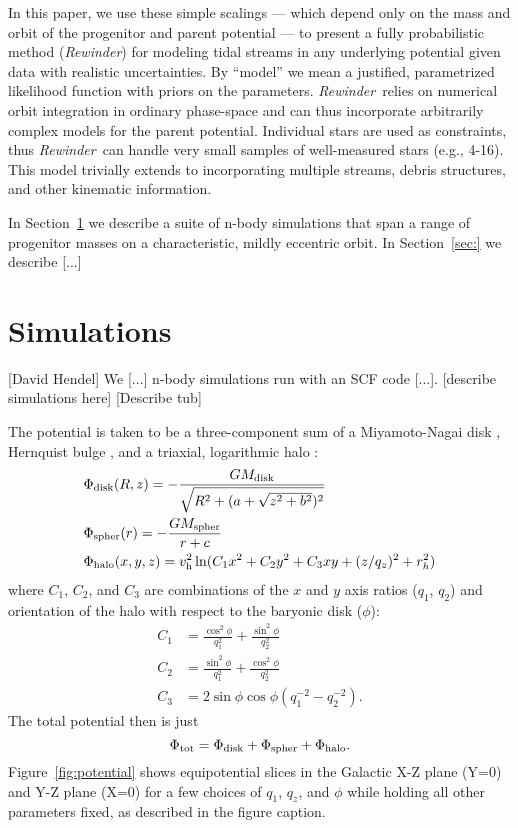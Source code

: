 \documentclass[letterpaper,12pt,preprint]{aastex}
\newcommand{\vhalo}{v_{\rm h}}
\newcommand{\rewinder}{\emph{Rewinder}}
\begin{document}
In this paper, we use these simple scalings --- which depend only on the mass and orbit of the progenitor and parent potential --- to present a fully probabilistic method (\rewinder) for modeling tidal streams in any underlying potential given data with realistic uncertainties. By ``model'' we mean a justified, parametrized likelihood function with priors on the parameters. \rewinder\, relies on numerical orbit integration in ordinary phase-space and can thus incorporate arbitrarily complex models for the parent potential. Individual stars are used as constraints, thus \rewinder\, can handle very small samples of well-measured stars (e.g., 4-16). This model trivially extends to incorporating multiple streams, debris structures, and other kinematic information. 

In Section~\ref{sec:sims} we describe a suite of n-body simulations that span a range of progenitor masses on a characteristic, mildly eccentric orbit. In Section~\ref{sec:} we describe [...]

\section{Simulations}\label{sec:sims}
[David Hendel]
We [...] n-body simulations run with an SCF code [...]. [describe simulations here] [Describe tub]

The potential is taken to be a three-component sum of a Miyamoto-Nagai disk \citep{}, Hernquist bulge \citep[spheroid;][]{}, and a triaxial, logarithmic halo \citep[e.g.,][]{law10}:
\begin{align}
	&\Phi_{\rm disk}(R,z) = -\frac{GM_{\rm disk}}{\sqrt{R^2 + (a + \sqrt{z^2 + b^2})^2}}\\
	&\Phi_{\rm spher}(r) = -\frac{GM_{\rm spher}}{r + c}\\
	&\Phi_{\rm halo}(x,y,z) = \vhalo^2 \ln(C_1 x^2 + C_2 y^2 + C_3 xy + (z/q_z)^2 + r_h^2)
\end{align}
where $C_1$, $C_2$, and $C_3$ are combinations of the $x$ and $y$ axis
ratios ($q_1$, $q_2$) and orientation of the halo with respect to the
baryonic disk ($\phi$):
\begin{align}
  C_1 &= \frac{\cos^2\phi}{q_1^2} + \frac{\sin^2\phi}{q_2^2}\\
  C_2 &= \frac{\sin^2\phi}{q_1^2} + \frac{\cos^2\phi}{q_2^2}\\
  C_3 &= 2\sin\phi\cos\phi \left(q_1^{-2} - q_2^{-2}\right).
\end{align}
The total potential then is just
\begin{equation}
	\Phi_{\rm tot} = \Phi_{\rm disk} + \Phi_{\rm spher} + \Phi_{\rm halo}\label{eq:lm10}.
\end{equation}
Figure~\ref{fig:potential} shows equipotential slices in the Galactic X-Z plane (Y=0) and Y-Z plane (X=0) for a few choices of  $q_1$,  $q_z$, and $\phi$ while holding all other parameters fixed, as described in the figure caption.
\end{document}
